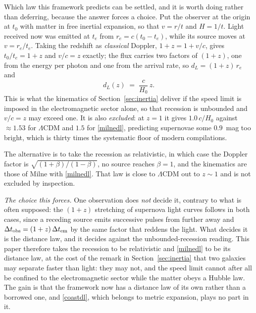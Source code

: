 \documentclass[11pt]{article}
\begin{document}
Which law this framework predicts can be settled, and it is worth doing rather than deferring, because the
answer forces a choice. Put the observer at the origin at $t_0$ with matter in free inertial expansion, so that
$v=r/t$ and $H=1/t$. Light received now was emitted at $t_e$ from $r_e=c(t_0-t_e)$, while its source moves at
$v=r_e/t_e$. Taking the redshift as \emph{classical} Doppler, $1+z=1+v/c$, gives $t_0/t_e=1+z$ and
$v/c=z$ exactly; the flux carries two factors of $(1+z)$, one from the energy per photon and one from the arrival
rate, so $d_L=(1+z)\,r_e$ and
\begin{equation}\label{galdl}
d_L(z) \;=\; \frac{c}{H_0}\,z .
\end{equation}
This is what the kinematics of Section~\ref{sec:inertia} deliver if the speed limit is imposed in the
electromagnetic sector alone, so that recession is unbounded and $v/c=z$ may exceed one. It is also
\emph{excluded}: at $z=1$ it gives $1.0\,c/H_0$ against ${\approx}1.53$ for $\Lambda$CDM and $1.5$ for
\eqref{milnedl}, predicting supernovae some $0.9$~mag too bright, which is thirty times the systematic floor of
modern compilations.

The alternative is to take the recession as relativistic, in which case the Doppler factor is
$\sqrt{(1+\beta)/(1-\beta)}$, no source reaches $\beta=1$, and the kinematics are those of Milne with
\eqref{milnedl}. That law is close to $\Lambda$CDM out to $z\sim1$ and is not excluded by inspection.

\emph{The choice this forces.} One observation does \emph{not} decide it, contrary to what is often supposed: the
$(1+z)$ stretching of supernova light curves follows in both cases, since a receding source emits successive
pulses from further away and $\Delta t_{\rm obs}=(1+z)\,\Delta t_{\rm em}$ by the same factor that reddens the
light. What decides it is the distance law, and it decides against the unbounded-recession reading. This paper
therefore takes the recession to be relativistic and \eqref{milnedl} to be its distance law, at the cost of the
remark in Section~\ref{sec:inertia} that two galaxies may separate faster than light: they may not, and the
speed limit cannot after all be confined to the electromagnetic sector while the matter obeys a Hubble law. The
gain is that the framework now has a distance law of its own rather than a borrowed one, and \eqref{coastdl},
which belongs to metric expansion, plays no part in it.
\end{document}
